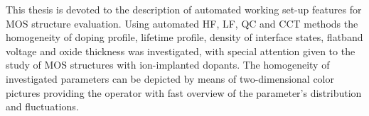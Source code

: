 This thesis is devoted to the description of automated working set-up
features for MOS structure evaluation. Using automated HF, LF, QC and
CCT methods the homogeneity of doping profile, lifetime profile,
density of interface states, flatband voltage and oxide thickness was
investigated, with special attention given to the study of MOS
structures with ion-implanted dopants. The homogeneity of investigated
parameters can be depicted by means of two-dimensional color pictures
providing the operator with fast overview of the parameter's
distribution and fluctuations.
